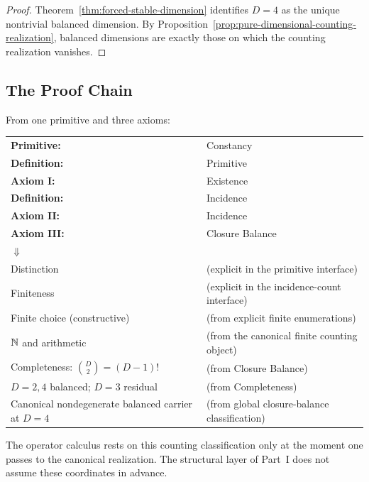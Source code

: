 \begin{proof}
Theorem~\ref{thm:forced-stable-dimension} identifies \(D=4\) as the unique
nontrivial balanced dimension. By
Proposition~\ref{prop:pure-dimensional-counting-realization}, balanced
dimensions are exactly those on which the counting realization vanishes.
\end{proof}


\subsection{The Proof Chain}
\label{subsec:proof-chain}

From one primitive and three axioms:

\begin{center}
\begin{tabular}{ll}
\toprule
\textbf{Primitive:} & Constancy \\
\textbf{Definition:} & Primitive \\
\textbf{Axiom I:} & Existence \\
\textbf{Definition:} & Incidence \\
\textbf{Axiom II:} & Incidence \\
\textbf{Axiom III:} & Closure Balance \\
\midrule
$\Downarrow$ & \\
Distinction & (explicit in the primitive interface) \\
Finiteness & (explicit in the incidence-count interface) \\
Finite choice (constructive) & (from explicit finite enumerations) \\
$\mathbb{N}$ and arithmetic & (from the canonical finite counting object) \\
Completeness: $\binom{D}{2} = (D-1)!$ & (from Closure Balance) \\
$D = 2, 4$ balanced; $D = 3$ residual & (from Completeness) \\
Canonical nondegenerate balanced carrier at $D = 4$ & (from global closure-balance classification) \\
\bottomrule
\end{tabular}
\end{center}

The operator calculus rests on this counting classification only at the moment
one passes to the canonical realization. The structural layer of Part~I does
not assume these coordinates in advance.

